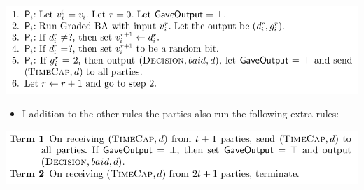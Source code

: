\documentclass[11pt]{article}
\begin{document}
\begin{center}
\includegraphics[width=.9\linewidth]{Asynchronous Agreement (8)/screenshot_2018-09-30_08-25-11.png}
\end{center}

\begin{itemize}
\item I addition to the other rules the parties also run the following extra rules:
\end{itemize}
\begin{center}
\includegraphics[width=.9\linewidth]{Asynchronous Agreement (8)/screenshot_2018-09-30_08-26-08.png}
\end{center}
\end{document}
